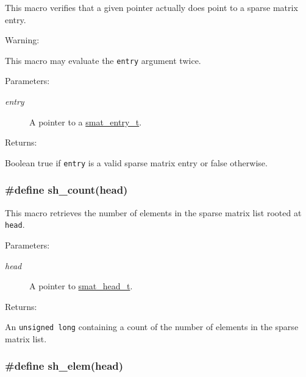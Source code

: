 This macro verifies that a given pointer actually does point to a sparse matrix entry.

\begin{Desc}
\item[Warning: ]\par
This macro may evaluate the {\tt entry} argument twice.\end{Desc}
\begin{Desc}
\item[Parameters: ]\par
\begin{description}
\item[{\em 
entry}]A pointer to a \hyperlink{group__dbprim__smat_a2}{smat\_\-entry\_\-t}.\end{description}
\end{Desc}
\begin{Desc}
\item[Returns: ]\par
Boolean true if {\tt entry} is a valid sparse matrix entry or false otherwise. \end{Desc}
\hypertarget{group__dbprim__smat_a34}{
\subsubsection[sh\_\-count]{\setlength{\rightskip}{0pt plus 5cm}\#define sh\_\-count(head)}}
\label{group__dbprim__smat_a34}


This macro retrieves the number of elements in the sparse matrix list rooted at {\tt head}.\begin{Desc}
\item[Parameters: ]\par
\begin{description}
\item[{\em 
head}]A pointer to \hyperlink{group__dbprim__smat_a1}{smat\_\-head\_\-t}.\end{description}
\end{Desc}
\begin{Desc}
\item[Returns: ]\par
An {\tt unsigned long} containing a count of the number of elements in the sparse matrix list. \end{Desc}
\hypertarget{group__dbprim__smat_a31}{
\subsubsection[sh\_\-elem]{\setlength{\rightskip}{0pt plus 5cm}\#define sh\_\-elem(head)}}
\label{group__dbprim__smat_a31}


